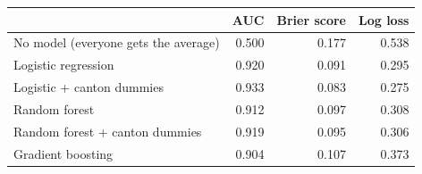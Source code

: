 \begin{tabular}{lrrr}
\toprule
 & AUC & Brier score & Log loss \\
\midrule
No model (everyone gets the average) & 0.500 & 0.177 & 0.538 \\
Logistic regression & 0.920 & 0.091 & 0.295 \\
Logistic + canton dummies & 0.933 & 0.083 & 0.275 \\
Random forest & 0.912 & 0.097 & 0.308 \\
Random forest + canton dummies & 0.919 & 0.095 & 0.306 \\
Gradient boosting & 0.904 & 0.107 & 0.373 \\
\bottomrule
\end{tabular}
